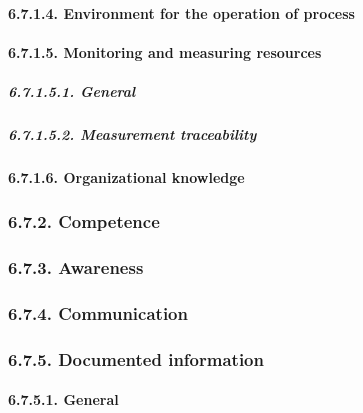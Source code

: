 \documentclass[
]{article}
\begin{document}
\hypertarget{environment-for-the-operation-of-process}{%
\paragraph{6.7.1.4. Environment for the operation of
process}\label{environment-for-the-operation-of-process}}

\hypertarget{monitoring-and-measuring-resources}{%
\paragraph{6.7.1.5. Monitoring and measuring
resources}\label{monitoring-and-measuring-resources}}

\hypertarget{general-2}{%
\subparagraph{6.7.1.5.1. General}\label{general-2}}

\hypertarget{measurement-traceability}{%
\subparagraph{6.7.1.5.2. Measurement
traceability}\label{measurement-traceability}}

\hypertarget{organizational-knowledge}{%
\paragraph{6.7.1.6. Organizational
knowledge}\label{organizational-knowledge}}

\hypertarget{competence}{%
\subsubsection{6.7.2. Competence}\label{competence}}

\hypertarget{awareness}{%
\subsubsection{6.7.3. Awareness}\label{awareness}}

\hypertarget{communication}{%
\subsubsection{6.7.4. Communication}\label{communication}}

\hypertarget{documented-information}{%
\subsubsection{6.7.5. Documented
information}\label{documented-information}}

\hypertarget{general-3}{%
\paragraph{6.7.5.1. General}\label{general-3}}
\end{document}
